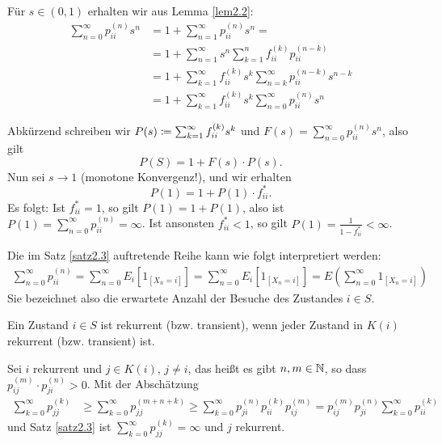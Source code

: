 \documentclass[a4paper,twoside,DIV15,BCOR12mm]{scrbook}
\begin{document}
\begin{beweis}
Für $s\in(0,1)$ erhalten wir aus Lemma \ref{lem2.2}:
\begin{align*}
\sum_{n=0}^\infty p_{ii}^{(n)} s^n &= 1 + \sum_{n=1}^\infty p_{ii}^{(n)} s^n = \\
&= 1 + \sum_{n=1}^\infty s^n\sum_{k=1}^n f_{ii}^{(k)}p_{ii}^{(n-k)} \\
&= 1 + \sum_{k=1}^\infty f_{ii}^{(k)} s^k \sum_{n=k}^\infty p_{ii}^{(n-k)} s^{n-k} \\
&= 1 + \sum_{k=1}^\infty f_{ii}^{(k)} s^k \sum_{n=0}^\infty p_{ii}^{(n)} s^{n} 
\end{align*}

Abkürzend schreiben wir $P(s)\da \sum_{k=1}^\infty f_{ii}^{(k)} s^k$ und $F(s)=\sum_{n=0}^\infty p_{ii}^{(n)} s^{n}$, also gilt \[P(S) = 1 + F(s)\cdot P(s).\]
Nun sei $s\to 1$ (monotone Konvergenz!), und wir erhalten
\[
P(1) = 1 + P(1)\cdot f_{ii}^*.
\]
Es folgt: Ist $f_{ii}^* = 1$, so gilt $P(1) = 1 + P(1)$, also ist $P(1) = \sum_{n=0}^\infty p_{ii}^{(n)} = \infty$. Ist ansonsten $f_{ii}^{*}<1$, so gilt $P(1) = \frac1{1-f_{ii}^*} < \infty$.
\end{beweis}

\begin{bemerkung}
Die im Satz \ref{satz2.3} auftretende Reihe kann wie folgt interpretiert werden:
\begin{align*}
\sum_{n=0}^\infty p_{ii}^{(n)}
= \sum_{n=0}^\infty E_i[1_{[X_n=i]}]
= \sum_{n=0}^\infty E_i[1_{[X_n=i]}]
= E(\sum_{n=0}^\infty 1_{[X_n=i]})
\end{align*}
Sie bezeichnet also die erwartete Anzahl der Besuche des Zustandes $i\in S$.
\end{bemerkung}

\begin{satz}[Solidaritätsprinzip]
Ein Zustand $i\in S$ ist rekurrent (bzw. transient), wenn jeder Zustand in $K(i)$ rekurrent (bzw. transient) ist.
\end{satz}

\begin{beweis}
Sei $i$ rekurrent und $j\in K(i)$, $j\ne i$, das heißt es gibt $n,m\in \mathbb{N}$, so dass $p_{ij}^{(m)}\cdot p_{ji}^{(n)}>0$.
Mit der Abschätzung
\begin{align*}
\sum_{k=0}^\infty p_{jj}^{(k)} 
&\ge \sum_{k=0}^\infty p_{jj}^{(m+n+k)} 
\ge \sum_{k=0}^\infty p_{ji}^{(n)} p_{ii}^{(k)} p_{ij}^{(m)}
= p_{ij}^{(m)} p_{ji}^{(n)} \sum_{k=0}^\infty p_{ii}^{(k)}
\end{align*}
und Satz \ref{satz2.3} ist $\sum_{k=0}^\infty p_{jj}^{(k)}=\infty$ und $j$ rekurrent.
\end{beweis}
\end{document}
